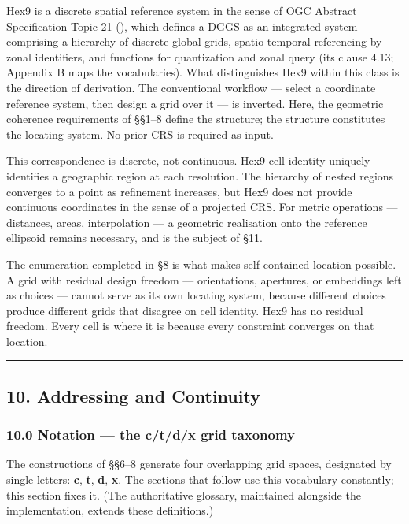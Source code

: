 \documentclass[
  11pt,
  a4paper,
]{article}
\begin{document}
Hex9 is a discrete spatial reference system in the sense of OGC Abstract
Specification Topic 21 (), which defines a DGGS as an integrated system
comprising a hierarchy of discrete global grids, spatio-temporal
referencing by zonal identifiers, and functions for quantization and
zonal query (its clause 4.13; Appendix B maps the vocabularies). What
distinguishes Hex9 within this class is the direction of derivation. The
conventional workflow --- select a coordinate reference system, then
design a grid over it --- is inverted. Here, the geometric coherence
requirements of §§1--8 define the structure; the structure constitutes
the locating system. No prior CRS is required as input.

This correspondence is discrete, not continuous. Hex9 cell identity
uniquely identifies a geographic region at each resolution. The
hierarchy of nested regions converges to a point as refinement
increases, but Hex9 does not provide continuous coordinates in the sense
of a projected CRS. For metric operations --- distances, areas,
interpolation --- a geometric realisation onto the reference ellipsoid
remains necessary, and is the subject of §11.

The enumeration completed in §8 is what makes self-contained location
possible. A grid with residual design freedom --- orientations,
apertures, or embeddings left as choices --- cannot serve as its own
locating system, because different choices produce different grids that
disagree on cell identity. Hex9 has no residual freedom. Every cell is
where it is because every constraint converges on that location.

\begin{center}\rule{0.5\linewidth}{0.5pt}\end{center}

\subsection{10. Addressing and
Continuity}\label{addressing-and-continuity}

\subsubsection{10.0 Notation --- the c/t/d/x grid
taxonomy}\label{notation-the-ctdx-grid-taxonomy}

The constructions of §§6--8 generate four overlapping grid spaces,
designated by single letters: \textbf{c}, \textbf{t}, \textbf{d},
\textbf{x}. The sections that follow use this vocabulary constantly;
this section fixes it. (The authoritative glossary, maintained alongside
the implementation, extends these definitions.)
\end{document}
